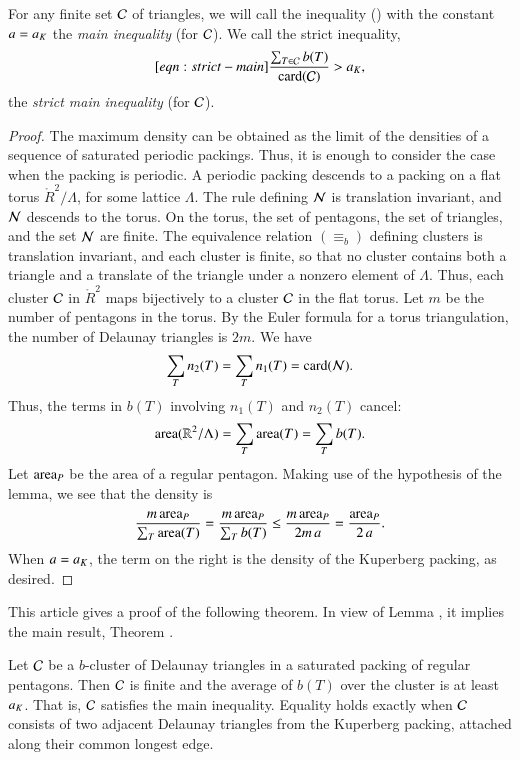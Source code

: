 For any finite set $\mathcal C$ of triangles, we will call the inequality
() with the constant $a=a_K$ the {\it main inequality}
(for $\mathcal C$).  We call the strict inequality,
\begin{equation}\libel{eqn:strict-main}
\frac{\sum_{T\in \C} b(T)}{\card(\C)} > \aK,
\end{equation}
the {\it strict main inequality} (for $\mathcal C$).


\begin{proof} The maximum density can be obtained as the limit of the
  densities of a sequence of saturated periodic packings.  Thus, it is
  enough to consider the case when the packing is periodic.  A
  periodic packing descends to a packing on a flat torus
  $\ring{R}^2/\Lambda$, for some lattice $\Lambda$.  The rule defining
  $\mathcal N$ is translation invariant, and $\mathcal N$ descends to the torus.  On
  the torus, the set of pentagons, the set of triangles, and the set
  $\mathcal N$ are finite.  The equivalence relation $(\equiv_b)$ defining
  clusters is translation invariant, and each cluster is finite, so
  that no cluster contains both a triangle and a translate of the
  triangle under a nonzero element of $\Lambda$.  Thus, each cluster
  $\mathcal C$ in $\ring{R}^2$ maps bijectively to a cluster $\mathcal C$ in the flat
  torus.  Let $m$ be the number of pentagons in the torus.  By the
  Euler formula for a torus triangulation, the number of Delaunay
  triangles is $2m$.  We have
\[
\sum_{T} n_2(T) =  \sum_{T} n_1(T) = 
{\operatorname{card}}(\mathcal N).
\]
Thus, the terms in $b(T)$ involving $n_1(T)$ and $n_2(T)$ cancel:
\[
{\operatorname{area}}(\mathbb{R}^2/\Lambda) = \sum_T {\operatorname{area}}(T) = \sum_T b(T).
\]    
Let ${\operatorname{area}}_P$ be the area of a regular pentagon.  Making use of the
hypothesis of the lemma, we see that the density is
\[
\frac{m\, {\operatorname{area}}_P}{\sum_T {\operatorname{area}}(T)} 
=\frac{m\, {\operatorname{area}}_P}{\sum_T b(T)} \le\frac{m\, {\operatorname{area}}_P}{2 m\, a} 
= \frac{{\operatorname{area}}_P}{2\, a}.
\]
When $a=a_K$, the term on the right is the density of the Kuperberg
packing, as desired.
\end{proof}

This article gives a proof of the following theorem. In view of Lemma ,
it implies the main result, Theorem .

\begin{theorem}
  Let $\mathcal C$ be a $b$-cluster of Delaunay triangles in a saturated
  packing of regular pentagons.  Then $\mathcal C$ is finite and the average
  of $b(T)$ over the cluster is at least $a_K$.  That is, $\mathcal C$
  satisfies the main inequality.  Equality holds exactly when $\mathcal C$
  consists of two adjacent Delaunay triangles from the Kuperberg
  packing, attached along their common longest edge.
\end{theorem}

